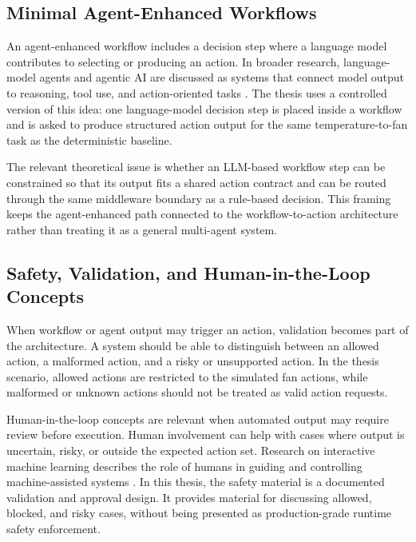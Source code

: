 \subsection{Minimal Agent-Enhanced Workflows}\label{subsec:agent-enhanced-workflows}

An agent-enhanced workflow includes a decision step where a language model contributes to selecting or producing an action. In broader research, language-model agents and agentic AI are discussed as systems that connect model output to reasoning, tool use, and action-oriented tasks \cite{reactYao2023,agenticAiHosseini2025,agenticTaxonomySapkota2025}. The thesis uses a controlled version of this idea: one language-model decision step is placed inside a workflow and is asked to produce structured action output for the same temperature-to-fan task as the deterministic baseline.

The relevant theoretical issue is whether an LLM-based workflow step can be constrained so that its output fits a shared action contract and can be routed through the same middleware boundary as a rule-based decision. This framing keeps the agent-enhanced path connected to the workflow-to-action architecture rather than treating it as a general multi-agent system.

\subsection{Safety, Validation, and Human-in-the-Loop Concepts}\label{subsec:safety-hitl-theory}

When workflow or agent output may trigger an action, validation becomes part of the architecture. A system should be able to distinguish between an allowed action, a malformed action, and a risky or unsupported action. In the thesis scenario, allowed actions are restricted to the simulated fan actions, while malformed or unknown actions should not be treated as valid action requests.

Human-in-the-loop concepts are relevant when automated output may require review before execution. Human involvement can help with cases where output is uncertain, risky, or outside the expected action set. Research on interactive machine learning describes the role of humans in guiding and controlling machine-assisted systems \cite{humanInTheLoopAmershi2014}. In this thesis, the safety material is a documented validation and approval design. It provides material for discussing allowed, blocked, and risky cases, without being presented as production-grade runtime safety enforcement.

